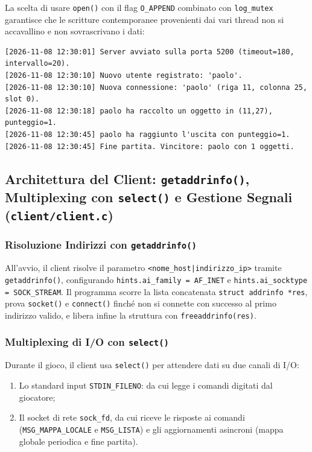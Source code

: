 \documentclass[11pt,a4paper]{article}
\begin{document}
La scelta di usare \texttt{open()} con il flag \texttt{O\_APPEND} combinato con \texttt{log\_mutex} garantisce che le scritture contemporanee provenienti dai vari thread non si accavallino e non sovrascrivano i dati:

\begin{lstlisting}[style=bashstyle]
[2026-11-08 12:30:01] Server avviato sulla porta 5200 (timeout=180, intervallo=20).
[2026-11-08 12:30:10] Nuovo utente registrato: 'paolo'.
[2026-11-08 12:30:10] Nuova connessione: 'paolo' (riga 11, colonna 25, slot 0).
[2026-11-08 12:30:18] paolo ha raccolto un oggetto in (11,27), punteggio=1.
[2026-11-08 12:30:45] paolo ha raggiunto l'uscita con punteggio=1.
[2026-11-08 12:30:45] Fine partita. Vincitore: paolo con 1 oggetti.
\end{lstlisting}

\subsection{Architettura del Client: \texttt{getaddrinfo()}, Multiplexing con \texttt{select()} e Gestione Segnali (\texttt{client/client.c})}

\subsubsection{Risoluzione Indirizzi con \texttt{getaddrinfo()}}
All'avvio, il client risolve il parametro \texttt{<nome\_host|indirizzo\_ip>} tramite \texttt{getaddrinfo()}, configurando \texttt{hints.ai\_family = AF\_INET} e \texttt{hints.ai\_socktype = SOCK\_STREAM}. Il programma scorre la lista concatenata \texttt{struct addrinfo *res}, prova \texttt{socket()} e \texttt{connect()} finché non si connette con successo al primo indirizzo valido, e libera infine la struttura con \texttt{freeaddrinfo(res)}.

\subsubsection{Multiplexing di I/O con \texttt{select()}}
Durante il gioco, il client usa \texttt{select()} per attendere dati su due canali di I/O:
\begin{enumerate}
    \item Lo standard input \texttt{STDIN\_FILENO}: da cui legge i comandi digitati dal giocatore;
    \item Il socket di rete \texttt{sock\_fd}, da cui riceve le risposte ai comandi (\texttt{MSG\_MAPPA\_LOCALE} e \texttt{MSG\_LISTA}) e gli aggiornamenti asincroni (mappa globale periodica e fine partita).
\end{enumerate}
\end{document}
